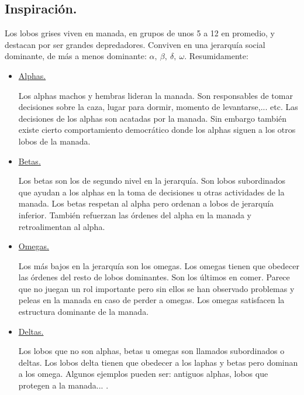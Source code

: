\documentclass[11pt,a4paper]{article}
\theoremstyle{definition}
\begin{document}
	\subsection{Inspiración.}
	Los lobos grises viven en manada, en grupos de unos 5 a 12 en promedio, y destacan por ser grandes depredadores. Conviven en una jerarquía social dominante, de más a menos dominante: $\alpha,\ \beta,\ \delta,\ \omega$. Resumidamente:
	\begin{itemize}
	\item \underline{Alphas.}
	
	Los alphas machos y hembras lideran la manada. Son responsables de tomar decisiones sobre la caza, lugar para dormir, momento de levantarse,... etc. Las decisiones de los alphas son acatadas por la manada. Sin embargo también existe cierto comportamiento democrático donde los alphas siguen a los otros lobos de la manada. 
	
	\item \underline{Betas.}
	
	Los betas son los de segundo nivel en la jerarquía. Son lobos subordinados que ayudan a los alphas en la toma de decisiones u otras actividades de la manada. Los betas respetan al alpha pero ordenan a lobos de jerarquía inferior. También refuerzan las órdenes del alpha en la manada y retroalimentan al alpha.
	
	\item \underline{Omegas.}
	
	Los más bajos en la jerarquía son los omegas. Los omegas tienen que obedecer las órdenes del resto de lobos dominantes. Son los últimos en comer. Parece que no juegan un rol importante pero sin ellos se han observado problemas y peleas en la manada en caso de perder a omegas. Los omegas satisfacen la estructura dominante de la manada. 
	
	\item \underline{Deltas.}
	
	Los lobos que no son alphas, betas u omegas son llamados subordinados o deltas. Los lobos delta tienen que obedecer a los laphas y betas pero dominan a los omega. Algunos ejemplos pueden ser: antiguos alphas, lobos que protegen a la manada... .
	
	\end{itemize}
	
\end{document}
